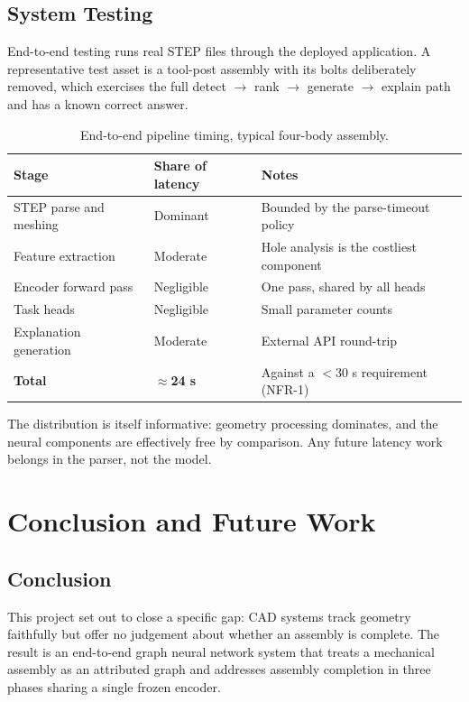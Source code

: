 \documentclass[12pt,oneside,a4paper]{report}
\begin{document}
\section{System Testing}

End-to-end testing runs real STEP files through the deployed application. A
representative test asset is a tool-post assembly with its bolts deliberately
removed, which exercises the full detect $\to$ rank $\to$ generate $\to$
explain path and has a known correct answer.

\begin{table}[h]
\centering
\caption{End-to-end pipeline timing, typical four-body assembly.}
\label{tab:timing}
\small
\begin{tabularx}{\textwidth}{@{}L{4.6cm}C{3.0cm}X@{}}
\toprule
\textbf{Stage} & \textbf{Share of latency} & \textbf{Notes} \\
\midrule
STEP parse and meshing & Dominant & Bounded by the parse-timeout policy \\
Feature extraction & Moderate & Hole analysis is the costliest component \\
Encoder forward pass & Negligible & One pass, shared by all heads \\
Task heads & Negligible & Small parameter counts \\
Explanation generation & Moderate & External API round-trip \\
\midrule
\textbf{Total} & \textbf{$\approx$24 s} & Against a $<$30 s requirement (NFR-1) \\
\bottomrule
\end{tabularx}
\end{table}

The distribution is itself informative: geometry processing dominates, and the
neural components are effectively free by comparison. Any future latency work
belongs in the parser, not the model.

\chapter{Conclusion and Future Work}

\section{Conclusion}

This project set out to close a specific gap: CAD systems track geometry
faithfully but offer no judgement about whether an assembly is complete. The
result is an end-to-end graph neural network system that treats a mechanical
assembly as an attributed graph and addresses assembly completion in three
phases sharing a single frozen encoder.
\end{document}
